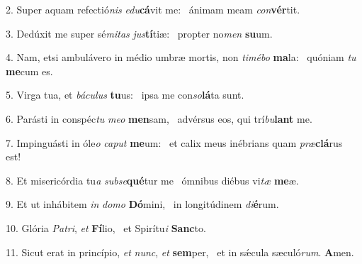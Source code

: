 2. Super aquam refectió\textit{nis} \textit{e}\textit{du}\textbf{cá}vit me: \ast\  ánimam meam \textit{con}\textbf{vér}tit.\

3. Dedúxit me super sé\textit{mi}\textit{tas} \textit{jus}\textbf{tí}tiæ: \ast\  propter no\textit{men} \textbf{su}um.\

4. Nam, etsi ambulávero in médio umbræ mortis, non \textit{ti}\textit{mé}\textit{bo} \textbf{ma}la: \ast\  quóniam \textit{tu} \textbf{me}cum es.\

5. Virga tua, et \textit{bá}\textit{cu}\textit{lus} \textbf{tu}us: \ast\  ipsa me con\textit{so}\textbf{lá}ta sunt.\

6. Parásti in conspéc\textit{tu} \textit{me}\textit{o} \textbf{men}sam, \ast\  advérsus eos, qui trí\textit{bu}\textbf{lant} me.\

7. Impinguásti in óle\textit{o} \textit{ca}\textit{put} \textbf{me}um: \ast\  et calix meus inébrians quam \textit{præ}\textbf{clá}rus est!\

8. Et misericórdia tu\textit{a} \textit{sub}\textit{se}\textbf{qué}tur me \ast\  ómnibus diébus vi\textit{tæ} \textbf{me}æ.\

9. Et ut inhábitem \textit{in} \textit{do}\textit{mo} \textbf{Dó}mini, \ast\  in longitúdinem \textit{di}\textbf{é}rum.\

10. Glória \textit{Pa}\textit{tri}, \textit{et} \textbf{Fí}lio, \ast\  et Spirítu\textit{i} \textbf{Sanc}to.\

11. Sicut erat in princípio, \textit{et} \textit{nunc}, \textit{et} \textbf{sem}per, \ast\  et in sǽcula sæculó\textit{rum}. \textbf{A}men.\

